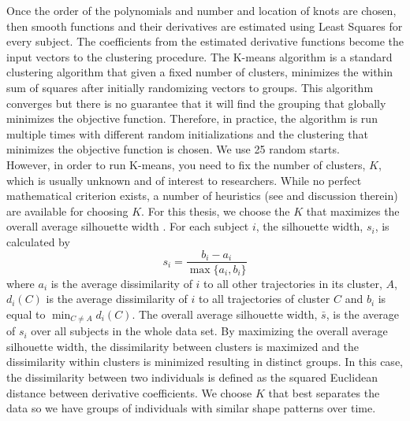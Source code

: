 \documentclass[12pt]{article}
\begin{document}
Once the order of the polynomials and number and location of knots are chosen, then smooth functions and their derivatives are estimated using Least Squares for every subject. The coefficients from the estimated derivative functions become the input vectors to the clustering procedure. The K-means algorithm is a standard clustering algorithm that given a fixed number of clusters, minimizes the within sum of squares after initially randomizing vectors to groups. This algorithm converges but there is no guarantee that it will find the grouping that globally minimizes the objective function. Therefore, in practice, the algorithm is run multiple times with different random initializations and the clustering that minimizes the objective function is chosen. We use 25 random starts.\\

However, in order to run K-means, you need to fix the number of clusters, $K$, which is usually unknown and of interest to researchers. While no perfect mathematical criterion exists, a number of heuristics (see \cite{tibshirani2001} and discussion therein) are available for choosing $K$. For this thesis, we choose the $K$ that maximizes the overall average silhouette width \cite{rousseeuw1987}.  For each subject $i$, the silhouette width, $s_{i}$, is calculated by
$$s_{i}=\frac{b_{i}-a_{i}}{\max\{a_{i},b_{i}\}}$$
where $a_{i}$ is the average dissimilarity of $i$ to all other trajectories in its cluster, $A$, $d_{i}(C)$ is the average dissimilarity of $i$ to all trajectories of cluster $C$ and $b_{i}$ is equal to $\min_{C\not= A} d_{i}(C)$. The overall average silhouette width, $\bar{s}$, is the average of $s_{i}$ over all subjects in the whole data set. By maximizing the overall average silhouette width, the dissimilarity between clusters is maximized and the dissimilarity within clusters is minimized resulting in distinct groups. In this case, the dissimilarity between two individuals is defined as the squared Euclidean distance between derivative coefficients. We choose $K$ that best separates the data so we have groups of individuals with similar shape patterns over time.\\
\end{document}
